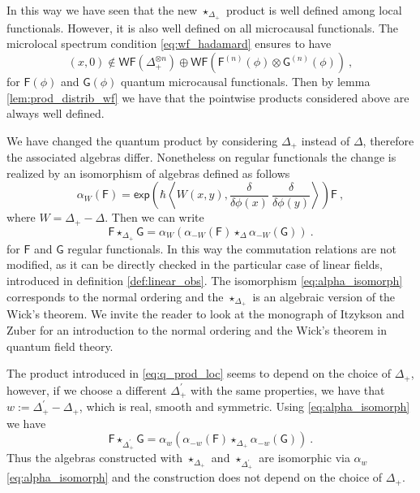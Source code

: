 \documentclass[11pt]{book}
\newcommand{\WF}{\mathsf{WF}}
\renewcommand{\exp}{\mathsf{exp}}
\newcommand{\sm}[1]{\left\langle#1\right\rangle}
\newcommand{\Fsf}{\mathsf{F}}
\newcommand{\Gsf}{\mathsf{G}}
\theoremstyle{break}
\begin{document}
In this way we have seen that the new $\star_{\Delta_+}$ product is well defined among local functionals. However, it is also well defined on all microcausal functionals. The microlocal spectrum condition \eqref{eq:wf_hadamard} ensures to have
%
\begin{equation*}
(x,0) \notin \WF(\Delta_+^{\otimes n}) \oplus \WF\left(\Fsf^{(n)}(\phi) \otimes \Gsf^{(n)}(\phi)\right) \ ,
\end{equation*}
%
for $\Fsf(\phi)$ and $\Gsf(\phi)$ quantum microcausal functionals. Then by lemma \ref{lem:prod_distrib_wf} we have that the pointwise products considered above are always well defined.


\bigskip


We have changed the quantum product by considering $\Delta_+$ instead of $\Delta$, therefore the associated algebras differ. Nonetheless on regular functionals the change is realized by an isomorphism of algebras defined as follows
%
\begin{equation}
\alpha_{W}(\Fsf) = \exp\left(\hbar \sm{ W(x,y) , \frac{\delta}{\delta\phi(x)} \ \frac{\delta}{\delta\phi(y)} } \right) \Fsf \ ,
\label{eq:alpha_isomorph} 
\end{equation}
%
where $W = \Delta_+ - \Delta$. Then we can write
%
\begin{equation*}
\Fsf \star_{\Delta_+} \Gsf = \alpha_W \left(\alpha_{-W}(\Fsf) \star_{\Delta} \alpha_{-W}(\Gsf)\right) \ .
\end{equation*}
%
for $\Fsf$ and $\Gsf$ regular functionals. In this way the commutation relations are not modified, as it can be directly checked in the particular case of linear fields, introduced in definition \ref{def:linear_obs}. The isomorphism \eqref{eq:alpha_isomorph} corresponds to the normal ordering and the $\star_{\Delta_+}$ is an algebraic version of the Wick's theorem. We invite the reader to look at the monograph of Itzykson and Zuber \cite{IZ_1980} for an introduction to the normal ordering and the Wick's theorem in quantum field theory. 


\bigskip


The product introduced in \eqref{eq:q_prod_loc} seems to depend on the choice of $\Delta_+$, however, if we choose a different $\Delta^\prime_+$ with the same properties, we have that $w:=\Delta^\prime_+ - \Delta_+$, which is real, smooth and symmetric. Using \eqref{eq:alpha_isomorph} we have
%
\begin{equation}
\Fsf \star_{\Delta^\prime_+} \Gsf = \alpha_w \left(\alpha_{-w}(\Fsf) \star_{\Delta_+} \alpha_{-w}(\Gsf)\right) \ .
\end{equation}
%
Thus the algebras constructed with $\star_{\Delta_+}$ and $\star_{\Delta^\prime_+}$ are isomorphic via $\alpha_{w}$ \eqref{eq:alpha_isomorph} and the construction does not depend on the choice of $\Delta_+$.
\end{document}
